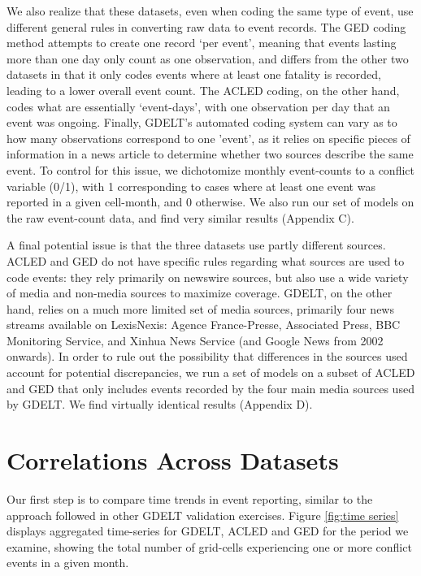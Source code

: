 \documentclass[hidelinks]{article}
\begin{document}
We also realize that these datasets, even when coding the same type of event, use different general rules in converting raw data to event records. The GED coding method attempts to create one record `per event', meaning that events lasting more than one day only count as one observation, and differs from the other two datasets in that it only codes events where at least one fatality is recorded, leading to a lower overall event count. The ACLED coding, on the other hand, codes what are essentially `event-days', with one observation per day that an event was ongoing. Finally, GDELT's automated coding system can vary as to how many observations correspond to one 'event', as it relies on specific pieces of information in a news article to determine whether two sources describe the same event. To control for this issue, we dichotomize monthly event-counts to a conflict variable (0/1), with 1 corresponding to cases where at least one event was reported in a given cell-month, and 0 otherwise. We also run our set of models on the raw event-count data, and find very similar results (Appendix C).

A final potential issue is that the three datasets use partly different sources. ACLED and GED do not have specific rules regarding what sources are used to code events: they rely primarily on newswire sources, but also use a wide variety of media and non-media sources to maximize coverage. GDELT, on the other hand, relies on a much more limited set of media sources, primarily four news streams available on LexisNexis: Agence France-Presse, Associated Press, BBC Monitoring Service, and Xinhua News Service (and Google News from 2002 onwards). In order to rule out the possibility that differences in the sources used account for potential discrepancies, we run a set of models on a subset of ACLED and GED that only includes events recorded by the four main media sources used by GDELT. We find virtually identical results (Appendix D).

\section*{Correlations Across Datasets}

Our first step is to compare time trends in event reporting, similar to the approach followed in other GDELT validation exercises. Figure \ref{fig:time series} displays aggregated time-series for GDELT, ACLED and GED for the period we examine, showing the total number of grid-cells experiencing one or more conflict events in a given month.
\end{document}
